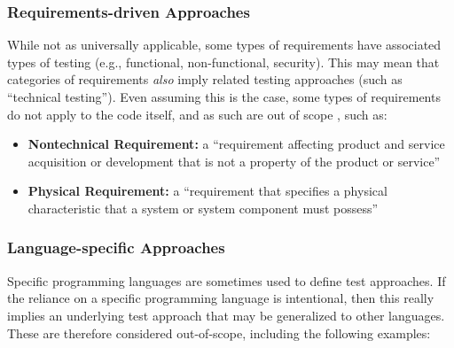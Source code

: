     \subsubsection{Requirements-driven Approaches}
    \label{req-test}
    While not as universally applicable, some types of requirements have associated
    types of testing (e.g., functional, non-functional, security). This may mean
    that categories of requirements \emph{also} imply related testing approaches
    (such as ``technical testing''). \ifnotpaper Even assuming this is the case, some types of
        requirements do not apply to the code itself, and as such are out of scope%
        , such as:
        \begin{itemize}
            \item \textbf{Nontechnical Requirement:} a ``requirement affecting product
                  and service acquisition or development that is not a property of
                  the product or service'' \citep[p.~293]{IEEE2017}
            \item \textbf{Physical Requirement:} a ``requirement that specifies a
                  physical characteristic that a system or system component must
                  possess'' \citep[p.~322]{IEEE2017}
        \end{itemize}
    \fi

    \subsubsection{Language-specific Approaches}
    \label{lang-test}
    Specific programming languages are sometimes used to define test approaches.
    If the reliance on a specific programming language is intentional, then
    this really implies an underlying test approach that may be generalized to
    other languages. These are therefore considered out-of-scope,
    including the following examples:

